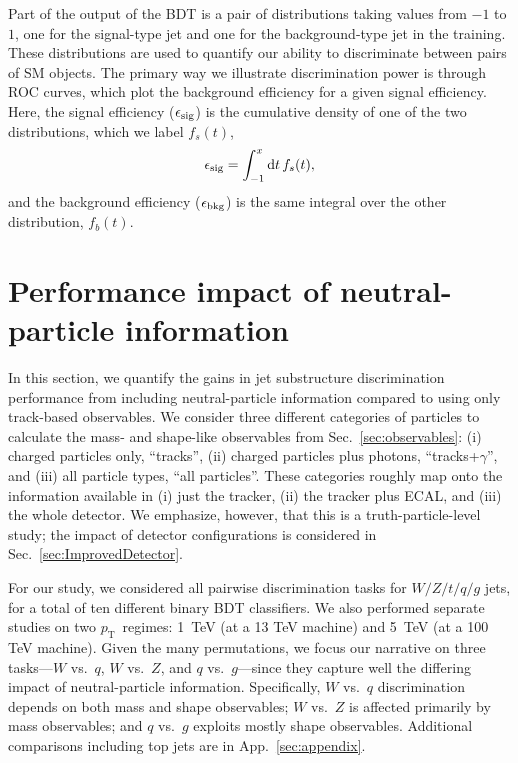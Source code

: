\documentclass[11pt,letterpaper]{article}
\DeclareRobustCommand{\Sec}[1]{Sec.~\ref{#1}}
\DeclareRobustCommand{\App}[1]{App.~\ref{#1}}
\newcommand{\pt}{p_{\mathrm{T}}}
\begin{document}
Part of the output of the BDT is a pair of distributions taking values from $-1$ to $1$, one for the signal-type jet and one for the background-type jet in the training.
%
These distributions are used to quantify our ability to discriminate between pairs of SM objects.
%
The primary way we illustrate discrimination power is through ROC curves, which plot the background efficiency for a given signal efficiency.
%
Here, the signal efficiency ($\epsilon_{\rm sig}$) is the cumulative density of one of the two distributions, which we label $f_s(t)$,
	\begin{align}
		\epsilon_{\rm sig} = \int_{-1}^x \textrm{d}t \, f_s(t),
	\end{align}
and the background efficiency ($\epsilon_{\rm bkg}$) is the same integral over the other distribution, $f_b(t)$.

\section{Performance impact of neutral-particle information}
\label{sec:results}

In this section, we quantify the gains in jet substructure discrimination performance from including neutral-particle information compared to using only track-based observables.
%
We consider three different categories of particles to calculate the mass- and shape-like observables from \Sec{sec:observables}:  (i) charged particles only, ``tracks'', (ii) charged particles plus photons, ``tracks+$\gamma$'', and (iii) all particle types, ``all particles''.
%
These categories roughly map onto the information available in (i) just the tracker, (ii) the tracker plus ECAL, and (iii) the whole detector.
%
We emphasize, however, that this is a truth-particle-level study; the impact of detector configurations is considered in \Sec{sec:ImprovedDetector}.

For our study, we considered all pairwise discrimination tasks for $W/Z/t/q/g$ jets, for a total of ten different binary BDT classifiers.
%
We also performed separate studies on two $\pt$~regimes: 1~TeV (at a 13 TeV machine) and 5~TeV (at a 100 TeV machine).
% 
Given the many permutations, we focus our narrative on three tasks---$W$ vs.\ $q$, $W$ vs.\ $Z$, and $q$ vs.\ $g$---since they capture well the differing impact of neutral-particle information.
%
Specifically, $W$ vs.~$q$ discrimination depends on both mass and shape observables; $W$ vs.~$Z$ is affected primarily by mass observables; and $q$ vs.~$g$ exploits mostly shape observables.  
%
Additional comparisons including top jets are in \App{sec:appendix}.
\end{document}
